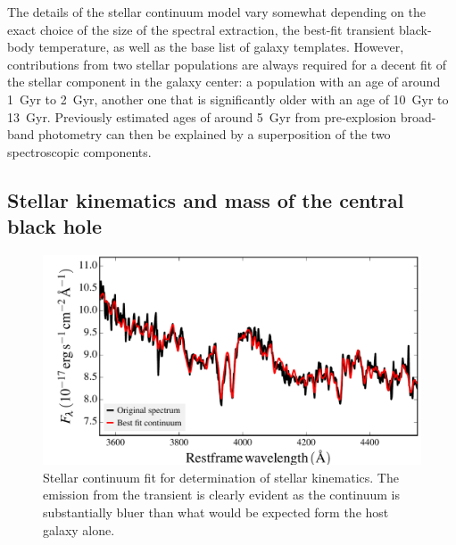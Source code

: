 \documentclass[traditabstract]{aa}
\begin{document}
The details of the stellar continuum model vary somewhat depending on the exact choice of the size of the spectral extraction, the best-fit transient black-body temperature, as well as the base list of galaxy templates. However, contributions from two stellar populations are always required for a decent fit of the stellar component in the galaxy center: a population with an age of around 1~Gyr to 2~Gyr, another one that is significantly older with an age of 10~Gyr to 13~Gyr. Previously estimated ages of around 5~Gyr from pre-explosion broad-band photometry \citep{2015ATel.7843....1M, 2016NatAs...1E...2L,  2016Sci...351..257D} can then be explained by a superposition of the two spectroscopic components. 

\subsection{Stellar kinematics and mass of the central black hole}

\begin{figure}
  \includegraphics[width=0.999\linewidth]{fig/XS_stargas.pdf}
\caption{Stellar continuum fit for determination of stellar kinematics. The emission from the transient is clearly evident as the continuum is substantially bluer than what would be expected form the host galaxy alone.}
\label{fig:stargas_sig}
\end{figure}
\end{document}
